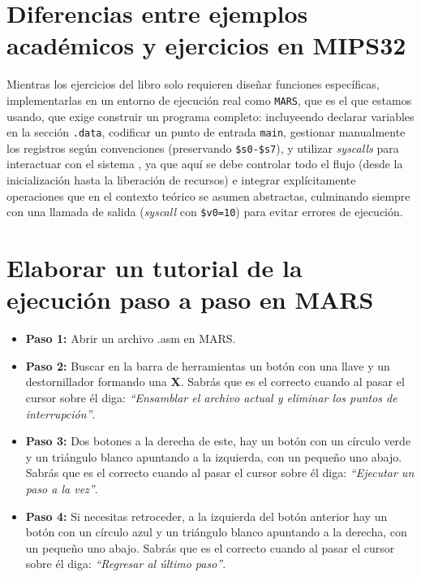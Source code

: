 \documentclass{article}
\begin{document}
\newpage
\section{Diferencias entre ejemplos académicos y ejercicios en MIPS32}

     Mientras los ejercicios del libro solo requieren diseñar funciones específicas, implementarlas en un entorno de ejecución real como \texttt{MARS}, que es el que estamos usando, que exige construir un programa completo: incluyeendo declarar variables en la sección \texttt{.data}, codificar un punto de entrada \texttt{main}, gestionar manualmente los registros según convenciones (preservando \texttt{\$s0-\$s7}), y utilizar \textit{syscalls} para interactuar con el sistema , ya que aquí se debe controlar todo el flujo (desde la inicialización hasta la liberación de recursos) e integrar explícitamente operaciones que en el contexto teórico se asumen abstractas, culminando siempre con una llamada de salida (\textit{syscall} con \texttt{\$v0=10}) para evitar errores de ejecución.

\section{Elaborar un tutorial de la ejecución paso a paso en MARS}

\begin{itemize}
      \item \textbf{Paso 1:} Abrir un archivo .asm en MARS.
      
      \item \textbf{Paso 2:} Buscar en la barra de herramientas un botón con una llave y un destornillador formando una \textbf{X}. Sabrás que es el correcto cuando al pasar el cursor sobre él diga: \textit{``Ensamblar el archivo actual y eliminar los puntos de interrupción''}.
      
      \item \textbf{Paso 3:} Dos botones a la derecha de este, hay un botón con un círculo verde y un triángulo blanco apuntando a la izquierda, con un pequeño uno abajo. Sabrás que es el correcto cuando al pasar el cursor sobre él diga: \textit{``Ejecutar un paso a la vez''}.
      
      \item \textbf{Paso 4:} Si necesitas retroceder, a la izquierda del botón anterior hay un botón con un círculo azul y un triángulo blanco apuntando a la derecha, con un pequeño uno abajo. Sabrás que es el correcto cuando al pasar el cursor sobre él diga: \textit{``Regresar al último paso''}.
      
\end{itemize}
\end{document}
